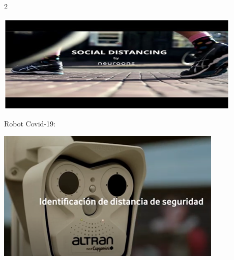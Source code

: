 \documentclass[12pt,spanish,Letterpaper,openany]{book}
\begin{document}
\begin {multicols}{2}
\begin {flushleft}
\begin{minipage}[c]{\columnwidth}
\end{minipage}
\end {flushleft}

\begin {flushleft}
\noindent\begin{minipage}[c]{\columnwidth}

\begin{center}\includegraphics[width=0.95\linewidth]{images/tum02} \end{center}

\end{minipage}
\end {flushleft}

Robot Covid-19:

\begin {flushleft}
\noindent\begin{minipage}[c]{\columnwidth}

\begin{center}\includegraphics[width=1\linewidth]{images/tum4} \end{center}

\end{minipage}
\end {flushleft}


\end{multicols}
\end{document}
